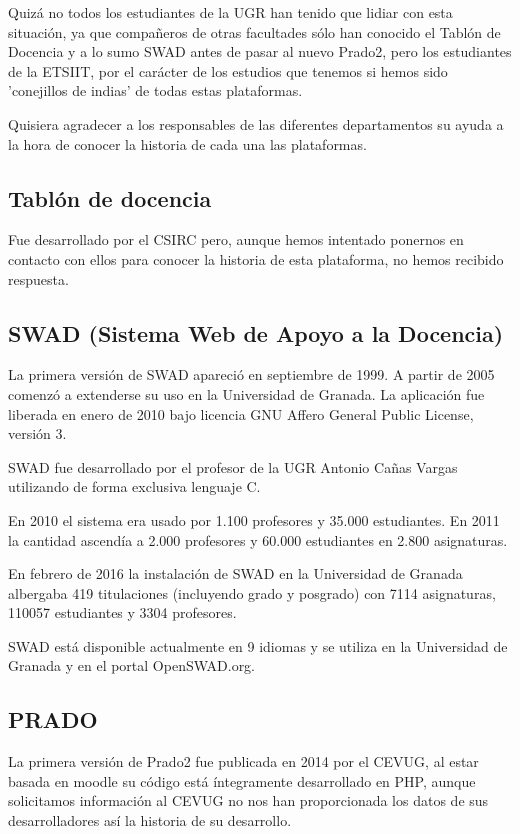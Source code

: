 \bigskip
Quizá no todos los estudiantes de la UGR han tenido que lidiar con esta situación, ya que compañeros de otras facultades sólo han conocido el Tablón de Docencia y a lo sumo SWAD antes de pasar al nuevo Prado2, pero los estudiantes de la ETSIIT, por el carácter de los estudios que tenemos si hemos sido 'conejillos de indias' de todas estas plataformas.

Quisiera agradecer a los responsables de las diferentes departamentos su ayuda a la hora de conocer la historia de cada una las plataformas.

\subsection{Tablón de docencia}

Fue desarrollado por el CSIRC pero, aunque hemos intentado ponernos en contacto con ellos para conocer la historia de esta plataforma, no hemos recibido respuesta.

\subsection{SWAD (Sistema Web de Apoyo a la Docencia)}

\bigskip
La primera versión de SWAD apareció en septiembre de 1999. A partir de 2005 comenzó a extenderse su uso en la Universidad de Granada. La aplicación fue liberada en enero de 2010 bajo licencia GNU Affero General Public License, versión 3.

\bigskip
SWAD fue desarrollado por el profesor de la UGR Antonio Cañas Vargas utilizando de forma exclusiva lenguaje C.

\bigskip
En 2010 el sistema era usado por 1.100 profesores y 35.000 estudiantes. En 2011 la cantidad ascendía a 2.000 profesores y 60.000 estudiantes en 2.800 asignaturas.

\bigskip
En febrero de 2016 la instalación de SWAD en la Universidad de Granada albergaba 419 titulaciones (incluyendo grado y posgrado) con 7114 asignaturas, 110057 estudiantes y 3304 profesores.

\bigskip
SWAD está disponible actualmente en 9 idiomas y se utiliza en la Universidad de Granada y en el portal OpenSWAD.org.


\subsection{PRADO}

La primera versión de Prado2 fue publicada en 2014 por el CEVUG, al estar basada en moodle su código está íntegramente desarrollado en PHP, aunque solicitamos información al CEVUG no nos han proporcionada los datos de sus desarrolladores así la historia de su desarrollo.

